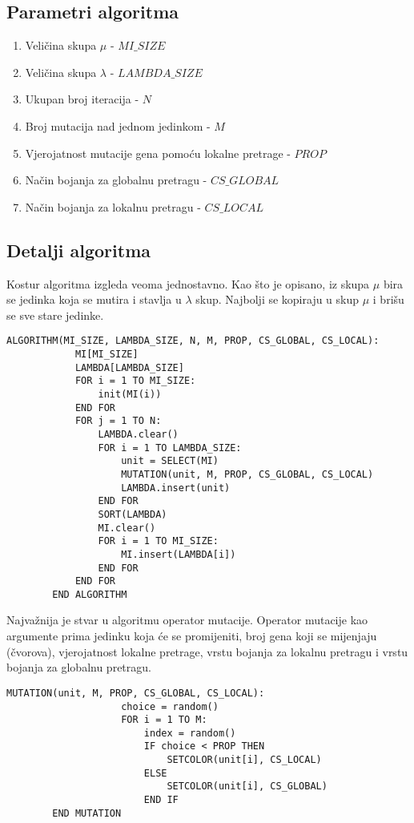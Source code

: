 \documentclass[times, utf8, diplomski, numeric]{fer}
\begin{document}
\subsection{Parametri algoritma}

\begin{enumerate}
	\item Veličina skupa $\mu$ - $MI\_SIZE$
	\item Veličina skupa $\lambda$ - $LAMBDA\_SIZE$
	\item Ukupan broj iteracija - $N$
	\item Broj mutacija nad jednom jedinkom - $M$
	\item Vjerojatnost mutacije gena pomoću lokalne pretrage - $PROP$
	\item Način bojanja za globalnu pretragu - $CS\_GLOBAL$
	\item Način bojanja za lokalnu pretragu - $CS\_LOCAL$
\end{enumerate}

\subsection{Detalji algoritma}

Kostur algoritma izgleda veoma jednostavno. Kao što je opisano, iz skupa $\mu$ bira se jedinka koja se mutira i stavlja u $\lambda$ skup. Najbolji se kopiraju u skup $\mu$ i brišu se sve stare jedinke. 

\begin{singlespace}
	\begin{lstlisting}[caption=Pseudok\^{o}d evolucijske strategije]
		ALGORITHM(MI_SIZE, LAMBDA_SIZE, N, M, PROP, CS_GLOBAL, CS_LOCAL):
			MI[MI_SIZE]
			LAMBDA[LAMBDA_SIZE]
			FOR i = 1 TO MI_SIZE:
				init(MI(i))
			END FOR
			FOR j = 1 TO N:
				LAMBDA.clear()
				FOR i = 1 TO LAMBDA_SIZE:
					unit = SELECT(MI)
					MUTATION(unit, M, PROP, CS_GLOBAL, CS_LOCAL)
					LAMBDA.insert(unit)
				END FOR
				SORT(LAMBDA)
				MI.clear()
				FOR i = 1 TO MI_SIZE:
					MI.insert(LAMBDA[i])
				END FOR
			END FOR
		END ALGORITHM
	\end{lstlisting}
\end{singlespace}

Najvažnija je stvar u algoritmu operator mutacije. Operator mutacije kao argumente prima jedinku koja će se promijeniti, broj gena koji se mijenjaju (čvorova), vjerojatnost lokalne pretrage, vrstu bojanja za lokalnu pretragu i vrstu bojanja za globalnu pretragu. 

\begin{singlespace}
	\begin{lstlisting}[caption=Pseudok\^{o}d mutacije evolucijske strategije]
		MUTATION(unit, M, PROP, CS_GLOBAL, CS_LOCAL):
					choice = random()
					FOR i = 1 TO M:
						index = random()
						IF choice < PROP THEN
							SETCOLOR(unit[i], CS_LOCAL)
						ELSE
							SETCOLOR(unit[i], CS_GLOBAL)
						END IF
		END MUTATION
	\end{lstlisting}
\end{singlespace}
\end{document}
